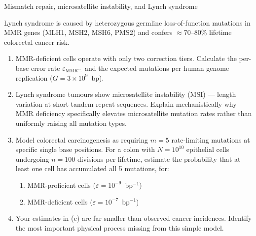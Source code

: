 \documentclass[12pt, a4paper, oneside]{report}
\begin{document}
\begin{problem}{\enspace{}\enspace{}\enspace{}\enspace Mismatch repair, microsatellite instability, and Lynch syndrome}

  Lynch syndrome is caused by heterozygous germline loss-of-function
  mutations in MMR genes (MLH1, MSH2, MSH6, PMS2) and confers
  $\approx$70--80\% lifetime colorectal cancer risk.

  \begin{enumerate}
    \item MMR-deficient cells operate with only two correction tiers.
          Calculate the per-base error rate $\varepsilon_\text{MMR^-}$
          and the expected mutations per human genome replication
          ($G = 3\times10^9$~bp).
    \item Lynch syndrome tumours show microsatellite instability (MSI) —
          length variation at short tandem repeat sequences. Explain
          mechanistically why MMR deficiency specifically elevates
          microsatellite mutation rates rather than uniformly raising
          all mutation types.
    \item Model colorectal carcinogenesis as requiring $m = 5$
          rate-limiting mutations at specific single base positions.
          For a colon with $N = 10^{10}$ epithelial cells undergoing
          $n = 100$ divisions per lifetime, estimate the probability
          that at least one cell has accumulated all 5 mutations, for:
          \begin{enumerate}[label=(\roman*)]
            \item MMR-proficient cells ($\varepsilon = 10^{-9}$~bp$^{-1}$)
            \item MMR-deficient cells ($\varepsilon = 10^{-7}$~bp$^{-1}$)
          \end{enumerate}
    \item Your estimates in (c) are far smaller than observed cancer
          incidences. Identify the most important physical process
          missing from this simple model.
  \end{enumerate}
\end{problem}
\end{document}
